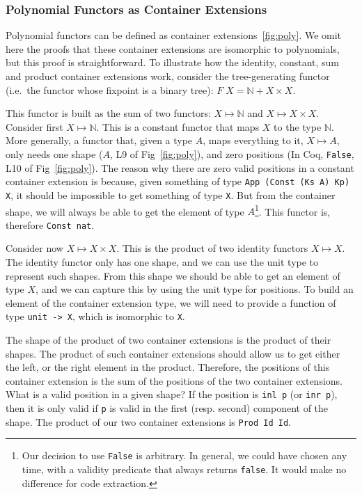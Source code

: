 \documentclass[a4paper, UKenglish, cleveref, autoref, thm-restate]{lipics-v2021}
\begin{document}
\subsubsection{Polynomial Functors as Container Extensions}
Polynomial functors can be defined as container extensions~\ref{fig:poly}. We
omit here the proofs that these container extensions are isomorphic to
polynomials, but this proof is straightforward. To illustrate how the identity,
constant, sum and product container extensions work, consider the
tree-generating functor (i.e.\ the functor whose fixpoint is a binary tree):
$F\; X = \mathbb{N} + X \times X$.

This functor is built as the sum of two functors: $X \mapsto \mathbb{N}$ and $X \mapsto
X \times X$. Consider first $X \mapsto \mathbb{N}$. This is a constant functor
that maps $X$ to the type $\mathbb{N}$. More generally, a functor that, given a
type $A$, maps everything to it, $X \mapsto A$, only needs one shape ($A$, L9
of Fig~\ref{fig:poly}), and zero positions (In Coq, \texttt{False},
L10 of Fig~\ref{fig:poly}). The reason why there are zero valid positions in
a constant container extension is because, given something of type 
\texttt{App (Const (Ks A) Kp) X}, it should be impossible to get
something of type \texttt{X}. But from the container shape, we will
always be able to get the element of type $A$\footnote{%
  Our decision to use \texttt{False} is arbitrary. In general, we
  could have chosen any time, with a validity predicate that always returns
  \texttt{false}. It would make no difference for code extraction.
}. This functor is, therefore \texttt{Const nat}.

Consider now $X \mapsto X \times X$. This is the product of two
identity functors $X \mapsto X$. The identity functor only has one shape, and
we can use the unit type to represent such shapes. From this shape we should be
able to get an element of type $X$, and we can capture this by using the unit
type for positions. To build an element of the container extension type, we
will need to provide a function of type \texttt{unit -> X}, which is
isomorphic to \texttt{X}. 

The shape of the product of two container extensions is the product of their
shapes. The product of such container extensions should allow us to get either
the left, or the right element in the product. Therefore, the positions of this
container extension is the sum of the positions of the two container
extensions. What is a valid position in a given shape? If the position is
\texttt{inl p} (or \texttt{inr p}), then it is only valid if
\texttt{p} is valid in the first (resp. second) component of the
shape. The product of our two container extensions is
\texttt{Prod Id Id}. 
\end{document}
